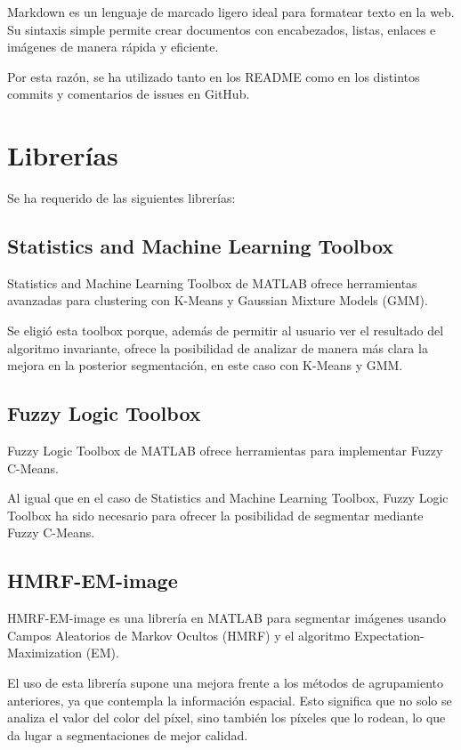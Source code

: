 Markdown es un lenguaje de marcado ligero ideal para formatear texto en la web. Su sintaxis simple permite crear documentos con encabezados, listas, enlaces e imágenes de manera rápida y eficiente.

Por esta razón, se ha utilizado tanto en los README como en los distintos commits y comentarios de issues en GitHub.

\section{Librerías}\label{librerías}

Se ha requerido de las siguientes librerías:

\subsection{Statistics and Machine Learning Toolbox}\label{statistics-and-Machine-Learning-Toolbox}

Statistics and Machine Learning Toolbox de MATLAB ofrece herramientas avanzadas para clustering con K-Means y Gaussian Mixture Models (GMM). 

Se eligió esta toolbox porque, además de permitir al usuario ver el resultado del algoritmo invariante, ofrece la posibilidad de analizar de manera más clara la mejora en la posterior segmentación, en este caso con K-Means y GMM.

\subsection{Fuzzy Logic Toolbox}\label{fuzzy-logic-toolbox}

Fuzzy Logic Toolbox de MATLAB ofrece herramientas para implementar Fuzzy C-Means.

Al igual que en el caso de Statistics and Machine Learning Toolbox, Fuzzy Logic Toolbox ha sido necesario para ofrecer la posibilidad de segmentar mediante Fuzzy C-Means.

\subsection{HMRF-EM-image}\label{hmrf-em-image}

HMRF-EM-image es una librería en MATLAB para segmentar imágenes usando Campos Aleatorios de Markov Ocultos (HMRF) y el algoritmo Expectation-Maximization (EM).

El uso de esta librería supone una mejora frente a los métodos de agrupamiento anteriores, ya que contempla la información espacial. Esto significa que no solo se analiza el valor del color del píxel, sino también los píxeles que lo rodean, lo que da lugar a segmentaciones de mejor calidad.

